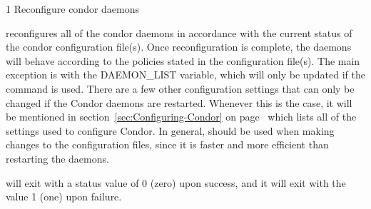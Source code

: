 \begin{ManPage}{\label{man-condor-reconfig}}{1}
{Reconfigure condor daemons}
\Synopsis {}
\ToolArgsBase
{}
\ToolArgsLocate


\Description 

 reconfigures all of the condor daemons in accordance with 
the current
status of the condor configuration file(s).  
Once reconfiguration is complete, the daemons will behave according to
the policies stated in the configuration file(s).
The main exception is with the DAEMON\_LIST variable, which will only be
updated if the  command is used.  
There are a few other configuration settings that can only be changed
if the Condor daemons are restarted.
Whenever this is the case, it will be mentioned in
section~\ref{sec:Configuring-Condor} on
page~\pageref{sec:Configuring-Condor} which lists all of the settings
used to configure Condor. 
In general,  should be used when making changes to
the configuration files, since it is faster and more efficient than
restarting the daemons.

\begin{Options}
    \ToolArgsBaseDesc
    \ToolArgsLocateDesc
\end{Options}

\ExitStatus

 will exit with a status value of 0 (zero) upon success,
and it will exit with the value 1 (one) upon failure.

\end{ManPage}
